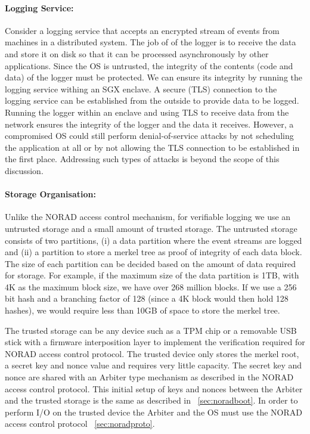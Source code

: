 \documentclass[withindex,glossary]{cam-thesis}
\begin{document}
\paragraph{Logging Service:}
Consider a logging service that accepts an encrypted stream of events from machines in a distributed system.
The job of of the logger is to receive the data and store it on disk so that it can be processed asynchronously by other applications.
Since the OS is untrusted, the integrity of the contents (code and data) of the logger must be protected.
We can ensure its integrity by running the logging service withing an SGX enclave.
A secure (TLS) connection to the logging service can be established from the outside to provide data to be logged.
Running the logger within an enclave and using TLS to receive data from the network ensures the integrity of the logger and the data it receives.
However, a compromised OS could still perform denial-of-service attacks by not scheduling the application at all or by not allowing the TLS connection to be established in the first place.
Addressing such types of attacks is beyond the scope of this discussion.

\paragraph{Storage Organisation:}
Unlike the NORAD access control mechanism, for verifiable logging we use an untrusted storage and a small amount of trusted storage.
The untrusted storage consists of two partitions,
(i) a data partition where the event streams are logged and
(ii) a partition to store a merkel tree as proof of integrity of each data block.
The size of each partition can be decided based on the amount of data required for storage.
For example, if the maximum size of the data partition is 1TB, with 4K as the maximum block size, we have over 268 million blocks.
If we use a 256 bit hash and a branching factor of 128 (since a 4K block would then hold 128 hashes), we would require less than 10GB of space to store the merkel tree.

The trusted storage can be any device such as a TPM chip or a removable USB stick with a firmware interposition layer to implement the verification required for NORAD access control protocol.
The trusted device only stores the merkel root, a secret key and nonce value and requires very little capacity.
The secret key and nonce are shared with an Arbiter type mechanism as described in the NORAD access control protocol.
This initial setup of keys and nonces between the Arbiter and the trusted storage is the same as described in ~\ref{sec:noradboot}.
In order to perform I/O on the trusted device the Arbiter and the OS must use the NORAD access control protocol ~\ref{sec:noradproto}.
\end{document}
